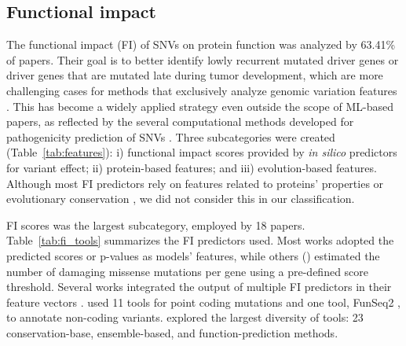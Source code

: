 \subsection{Functional impact}

The functional impact (FI) of SNVs on protein function was analyzed by 63.41\% of papers. Their goal is to better identify lowly recurrent mutated driver genes or driver genes that are mutated late during tumor development, which are more challenging cases for methods that exclusively analyze genomic variation features \cite{Oncodrive-fm}. This has become a widely applied strategy even outside the scope of ML-based papers, as reflected by the several computational methods developed for pathogenicity prediction of SNVs \cite{chen2020comprehensive, wu2016dbwgfp}. 
Three subcategories were created (Table~\ref{tab:features}): i) functional impact scores provided by \textit{in silico} predictors for variant effect;
ii) protein-based features; 
and iii) evolution-based features. 
Although most FI predictors rely on features related to proteins' properties or evolutionary conservation \cite{chen2020comprehensive}, we did not consider this in our classification. 

FI scores was the largest subcategory, employed by 18 papers. Table~\ref{tab:fi_tools} summarizes the FI predictors used. Most works adopted the predicted scores or p-values as models' features, while others (\eg \cite{Collier2019}) estimated the number of damaging missense mutations per gene using a pre-defined score threshold. Several works integrated the output of multiple FI predictors in their feature vectors \cite{Mao2013, Dong2016, Agajanian2018, Agajanian2019, Zhu2019, Wang2020}. \citet{Dong2016} used 11 tools for point coding mutations and one tool, FunSeq2 \cite{funseq2}, to annotate non-coding variants. 
\citet{Wang2020} explored the largest diversity of tools: 23 conservation-base, ensemble-based, and function-prediction methods.

